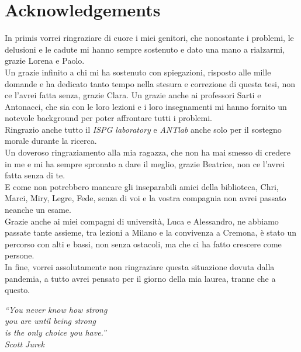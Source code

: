 \chapter{Acknowledgements}
\label{Acknowledgements}
\thispagestyle{empty}

\vspace{0.5cm}
In primis vorrei ringraziare di cuore i miei genitori, che nonostante i problemi, le delusioni e le cadute mi hanno sempre sostenuto e dato una mano a rialzarmi, grazie Lorena e Paolo.
\\
Un grazie infinito a chi mi ha sostenuto con spiegazioni, risposto alle mille domande e ha dedicato tanto tempo nella stesura e correzione di questa tesi, non ce l'avrei fatta senza, grazie Clara. Un grazie anche ai professori Sarti e Antonacci, che sia con le loro lezioni e i loro insegnamenti mi hanno fornito un notevole background per poter affrontare tutti i problemi.
\\
Ringrazio anche tutto il \textit{ISPG laboratory} e \textit{ANTlab} anche solo per il sostegno morale durante la ricerca.
\\
Un doveroso ringraziamento alla mia ragazza, che non ha mai smesso di credere in me e mi ha sempre spronato a dare il meglio, grazie Beatrice, non ce l'avrei fatta senza di te.
\\
E come non potrebbero mancare gli inseparabili amici della biblioteca, Chri, Marci, Miry, Legre, Fede, senza di voi e la vostra compagnia non avrei passato neanche un esame.
\\
Grazie anche ai miei compagni di università, Luca e Alessandro, ne abbiamo passate tante assieme, tra lezioni a Milano e la convivenza a Cremona, è stato un percorso con alti e bassi, non senza ostacoli, ma che ci ha fatto crescere come persone.
\\
In fine, vorrei assolutamente non ringraziare questa situazione dovuta dalla pandemia, a tutto avrei pensato per il giorno della mia laurea, tranne che a questo. 

\vspace{1cm}
\begin{flushright}
\textit{“You never know how strong \\ you are until being strong \\ is the only choice you have.” \\ Scott Jurek}
\end{flushright}